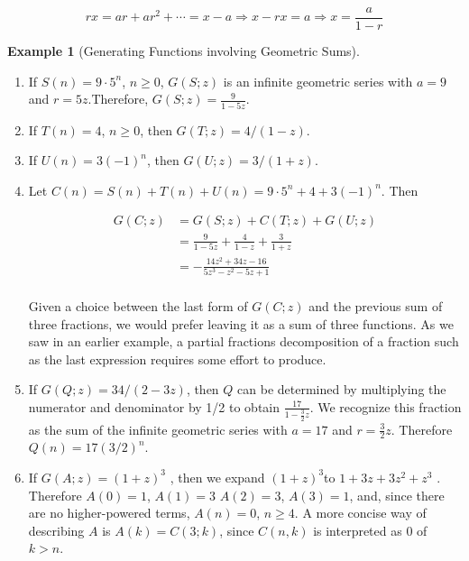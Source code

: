\documentclass[10pt,]{book}
\theoremstyle{plain}
\theoremstyle{definition}
\theoremstyle{definition}
\theoremstyle{definition}
\newtheorem{example}[theorem]{Example}
\theoremstyle{definition}
\numberwithin{equation}{section}
\begin{document}
\begin{equation*}r x =a r+ ar^2 +\cdots = x- a \Rightarrow x-rx=a \Rightarrow x=  \frac{a}{1-r}\end{equation*}
%
\begin{example}[Generating Functions involving Geometric Sums]\label{ex-geometric-sums}
\leavevmode%
\begin{enumerate}[label=\alph*]
\item\hypertarget{li-93}{} If \(S(n) = 9\cdot 5^n\), \(n \geq  0\), \(G(S;z)\) is an infinite geometric series with \(a = 9\) and \(r = 5z\).Therefore,  \(G(S;z) = \frac{9}{1 - 5z}\).%
\item\hypertarget{li-94}{} If \(T(n) = 4\), \(n \geq\)0, then \(G(T;z) = 4/(1 - z)\).%
\item\hypertarget{li-95}{}If \(U(n) = 3(-1)^n\), then \(G(U;z) = 3/(1 + z)\).%
\item\hypertarget{li-96}{}Let \(C(n) = S(n) + T(n) + U(n) = 9 \cdot  5^n + 4 + 3(-1)^n\).  Then

\begin{equation*}
\begin{split}
G(C;z) & = G(S;z) + C(T;z) + G(U;z)\\
		& = \frac{9}{1-5z} + \frac{4}{1-z}+ \frac{3}{1+z}\\
		& = -\frac{14 z^2+34z-16}{5 z^3-z^2-5 z+1}\\
\end{split}
\end{equation*}%
\par
Given a choice between the last form of \(G(C;z)\) and the previous sum of three fractions, we would prefer leaving it as a sum of three functions.
As we saw in an earlier example, a partial fractions decomposition of a fraction such as the last expression requires some effort to produce.%
\item\hypertarget{li-97}{} If \(G(Q;z) = 34/(2 - 3z)\), then \(Q\) can be determined by multiplying the numerator and denominator by 1/2 to obtain \(\frac{17}{1-\frac{3}{2}z}\).
We recognize this fraction as the sum of the infinite geometric series with \(a = 17\) and \(r = \frac{3}{2}z\). Therefore \(Q(n) = 17(3/2)^n\).%
\item\hypertarget{li-98}{}If \(G(A;z) = (1 + z)^3\) , then we expand \((1 + z)^3\)to \(1 + 3z + 3z^2 + z^{3}\) . Therefore \(A(0) = 1\), \(A(1) = 3\) \(A(2)= 3\), \(A(3) = 1\), and, since there are no higher-powered terms, \(A(n) = 0\), \(n \geq  4\). A more concise way of describing \(A\) is \(A(k)
= C(3;k)\), since \(C(n,k)\) is interpreted as 0 of \(k > n\).
%
\end{enumerate}
%
\end{example}
\end{document}
